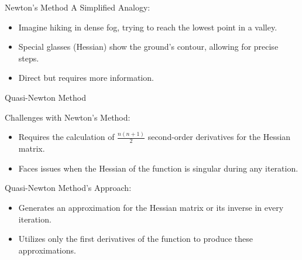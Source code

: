 \documentclass[
    NAME={Dr. Helga Ingimundardóttir},
    EMAIL={helgaingim@hi.is},
    FACULTY={Industrial Engineering},
    TITLE={Nonlinear Optimization},
    SUBTITLE={Approaches and Challenges},
    SEMINAR={VÉL113F},
    DATE={Design and Optimization}
]{../HI-latex/hi-beamer}
\begin{document}
\begin{frame}{Newton's Method}
        \framebreak
        \alert{A Simplified Analogy:}
        \begin{itemize}
            \item Imagine hiking in dense fog, trying to reach the lowest point in a valley.
            \item Special glasses (Hessian) show the ground's contour, allowing for precise steps.
            \item Direct but requires more information.
        \end{itemize}

    \end{frame}
    \begin{frame}{Quasi-Newton Method}

        \alert{Challenges with Newton's Method}:
        \begin{itemize}
            \item Requires the calculation of \(\tfrac{n(n+1)}{2}\) second-order derivatives for the Hessian
            matrix.
            \item Faces issues when the Hessian of the function is singular during any iteration.
        \end{itemize}

        \begin{block}{Quasi-Newton Method's Approach:}
            \begin{itemize}
                \item Generates an approximation for the Hessian matrix or its inverse in every iteration.
                \item Utilizes only the first derivatives of the function to produce these approximations.
            \end{itemize}
        \end{block}

        \framebreak


\end{frame}
\end{document}
